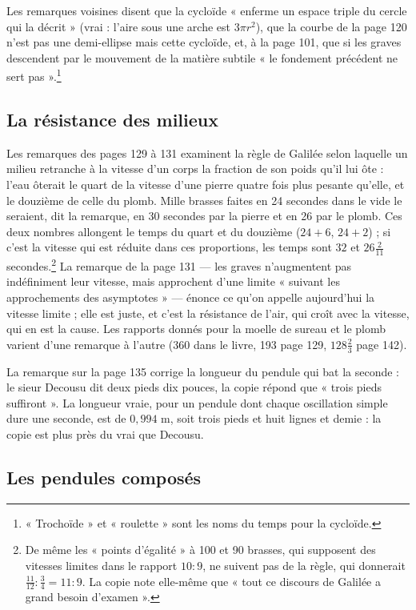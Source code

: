 \documentclass[11pt,a4paper]{article}
\begin{document}
Les remarques voisines disent que la cycloïde « enferme un espace triple du
cercle qui la décrit » (vrai : l'aire sous une arche est $3\pi r^2$), que la
courbe de la page 120 n'est pas une demi-ellipse mais cette cycloïde, et, à la
page 101, que si les graves descendent par le mouvement de la matière subtile
« le fondement précédent ne sert pas ».\footnote{« Trochoïde » et « roulette »
sont les noms du temps pour la cycloïde.}

\subsection*{La résistance des milieux}

Les remarques des pages 129 à 131 examinent la règle de Galilée selon laquelle un
milieu retranche à la vitesse d'un corps la fraction de son poids qu'il lui
ôte : l'eau ôterait le quart de la vitesse d'une pierre quatre fois plus
pesante qu'elle, et le douzième de celle du plomb. Mille brasses faites en 24
secondes dans le vide le seraient, dit la remarque, en 30 secondes par la pierre
et en 26 par le plomb. Ces deux nombres allongent le temps du quart et du
douzième ($24 + 6$, $24 + 2$) ; si c'est la vitesse qui est réduite dans ces
proportions, les temps sont $32$ et $26\frac{2}{11}$ secondes.\footnote{De même
les « points d'égalité » à 100 et 90 brasses, qui supposent des vitesses
limites dans le rapport $10 : 9$, ne suivent pas de la règle, qui donnerait
$\frac{11}{12} : \frac34 = 11 : 9$. La copie note elle-même que « tout ce
discours de Galilée a grand besoin d'examen ».} La remarque de la page 131 —
les graves n'augmentent pas indéfiniment leur vitesse, mais approchent d'une
limite « suivant les approchements des asymptotes » — énonce ce qu'on appelle
aujourd'hui la vitesse limite ; elle est juste, et c'est la résistance
de l'air, qui croît avec la vitesse, qui en est la cause. Les rapports donnés
pour la moelle de sureau et le plomb varient d'une remarque à l'autre (360 dans
le livre, 193 page 129, $128\frac23$ page 142).

La remarque sur la page 135 corrige la longueur du pendule qui bat la seconde :
le sieur Decousu dit deux pieds dix pouces, la copie répond que « trois pieds
suffiront ». La longueur vraie, pour un pendule dont chaque oscillation simple
dure une seconde, est de $0{,}994$ m, soit trois pieds et huit lignes et
demie : la copie est plus près du vrai que Decousu.

\subsection*{Les pendules composés}
\end{document}
